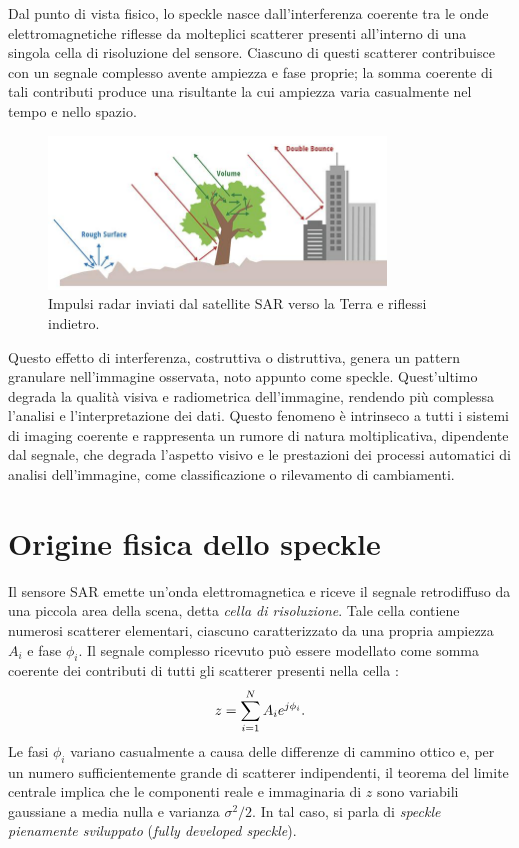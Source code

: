 Dal punto di vista fisico, lo speckle nasce dall’interferenza coerente tra le onde elettromagnetiche riflesse 
da molteplici scatterer presenti all’interno di una singola cella di risoluzione del sensore. 
Ciascuno di questi scatterer contribuisce con un segnale complesso avente ampiezza e fase proprie; 
la somma coerente di tali contributi produce una risultante la cui ampiezza varia casualmente nel tempo e nello spazio.
\begin{figure}[H]
  \centering
  \includegraphics[width=0.8\textwidth]{utils/SARPolarization.jpg}
  \caption{Impulsi radar inviati dal satellite SAR verso la Terra e riflessi indietro.}
  \label{fig:sar_scatter}
\end{figure}  
Questo effetto di interferenza, costruttiva o distruttiva, genera un pattern granulare nell’immagine osservata, 
noto appunto come speckle. Quest'ultimo degrada la qualità visiva e radiometrica dell’immagine, rendendo più complessa l’analisi e l’interpretazione dei dati. 
Questo fenomeno è intrinseco a tutti i sistemi di imaging coerente e rappresenta un rumore di natura moltiplicativa, dipendente dal segnale, che degrada l’aspetto visivo e le prestazioni dei processi automatici di analisi dell’immagine, come classificazione o rilevamento di cambiamenti.
\section{Origine fisica dello speckle}
Il sensore SAR emette un’onda elettromagnetica e riceve il segnale retrodiffuso da una piccola area della scena, detta \emph{cella di risoluzione}.  
Tale cella contiene numerosi scatterer elementari, ciascuno caratterizzato da una propria ampiezza $A_i$ e fase $\phi_i$.  
Il segnale complesso ricevuto può essere modellato come somma coerente dei contributi di tutti gli scatterer presenti nella cella \cite{6616053}:
\begin{equation}
  \makebox[\textwidth][c]{%
    $\displaystyle
      z = \sum_{i=1}^{N} A_i e^{j \phi_i}.
    $%
  }
\end{equation}
Le fasi $\phi_i$ variano casualmente a causa delle differenze di cammino ottico e, per un numero sufficientemente grande di scatterer indipendenti, il teorema del limite centrale implica che le componenti reale e immaginaria di $z$ sono variabili gaussiane a media nulla e varianza $\sigma^2 / 2$.  
In tal caso, si parla di \emph{speckle pienamente sviluppato} (\emph{fully developed speckle}).
